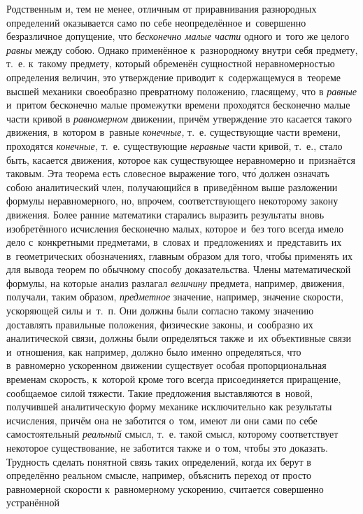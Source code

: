 Родственным и, тем не менее, отличным от приравнивания разнородных определений
оказывается само по себе неопределённое и~совершенно безразличное допущение,
что {\em бесконечно малые части} одного и~того же целого {\em равны} между
собою. Однако применённое к~разнородному внутри себя предмету, т.~е. к~такому
предмету, который обременён сущностной неравномерностью определения
величин, это утверждение приводит к~содержащемуся в~теореме высшей механики
своеобразно превратному положению, гласящему, что в {\em равные} и~притом
бесконечно малые промежутки времени проходятся бесконечно малые части кривой
в {\em равномерном} движении, причём утверждение это касается такого движения,
в~котором в~равные {\em конечные,} т.~е. существующие части времени, проходятся
{\em конечные,} т.~е. существующие {\em неравные} части кривой, т.~е., стало
быть, касается движения, которое как существующее неравномерно и~признаётся
таковым. Эта теорема есть словесное выражение того, чт\'{о} должен означать собою
аналитический член, получающийся в~приведённом выше разложении формулы
неравномерного, но, впрочем, соответствующего некоторому закону движения. Более
ранние математики старались выразить результаты вновь изобретённого исчисления
бесконечно малых, которое и~без того всегда имело дело с~конкретными
предметами, в~словах и~предложениях и~представить их в~геометрических
обозначениях, главным образом для того, чтобы применять их для вывода теорем по
обычному способу доказательства. Члены математической формулы, на которые
анализ разлагал {\em величину} предмета, например, движения, получали, таким
образом, {\em предметное} значение, например, значение скорости, ускоряющей
силы и~т.~п. Они должны были согласно такому значению доставлять правильные
положения, физические законы, и~сообразно их аналитической связи, должны были
определяться также и~их объективные связи и~отношения, как например, должно
было именно определяться, что в~равномерно ускоренном движении существует
особая пропорциональная временам скорость, к~которой кроме того всегда
присоединяется приращение, сообщаемое силой тяжести. Такие предложения
выставляются в~новой, получившей аналитическую форму механике исключительно как
результаты исчисления, причём она не заботится о~том, имеют ли они сами по себе
самостоятельный {\em реальный} смысл, т.~е. такой смысл, которому соответствует
некоторое существование, не заботится также и~о том, чтобы это доказать.
Трудность сделать понятной связь таких определений, когда их берут в
определённо реальном смысле, например, объяснить переход от просто равномерной
скорости к~равномерному ускорению, считается совершенно устранённой
